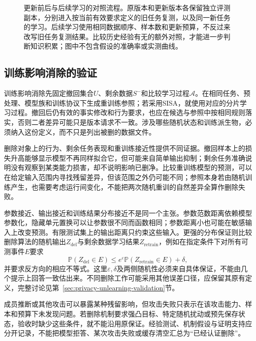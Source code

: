 \begin{figure}[htbp]
\centering

\caption{更新前后与后续学习的对照流程。原版本和更新版本各保留独立评测副本，分别进入按当前有效要求定义的旧任务复测，以及同一新任务的学习。后续学习使用相同数据顺序、样本数和更新预算，不反过来改写旧任务复测结果。比较历史经验有无的额外对照，才能进一步判断知识积累；图中不包含假设的准确率或实测曲线。}
\label{fig:ket-update-evaluation}
\end{figure}

\FloatBarrier
\subsection{训练影响消除的验证}
\label{sec:ket-update-unlearning-validation}

训练影响消除先固定撤回集合$U$、剩余数据$S^-$和比较学习过程$\mathcal A$。在相同任务、预处理、模型族和训练协议下生成重训练参照；若采用SISA，就使用对应的分片学习过程。撤回后仍有效的事实修改和行为要求，也应在候选与参照中按相同规则落实，否则二者差异可能只是版本请求不一致。涉及哪些随机状态和训练派生物，必须纳入这份定义，而不只是列出被删的数据文件。

删除对象上的行为、剩余任务表现和重训练接近性提供不同证据。撤回样本上的损失升高能够显示模型不再同样拟合它，但可能来自简单输出抑制；剩余任务准确说明没有观察到某类能力损害，却不说明影响已删净。比较重训练模型的预测，可以在给定输入范围内寻找残留差异，但该范围之外仍可能不同；参照本身若由随机训练产生，也需要考虑运行间变化，不能把两次随机重训的自然差异全算作删除失败。

参数接近、输出接近和训练结果分布接近不是同一个主张。参数范数距离依赖模型参数化，隐藏单元置换可以让参数很不同而函数相同；参数距离小也可能在敏感输入上改变预测。有限测试集上的输出距离只约束这些输入。更强的分布保证则比较删除算法的随机输出$Z_{\mathrm{del}}$与剩余数据学习结果$Z_{\mathrm{retrain}}$，例如在指定条件下对所有可测事件$E$要求
\[
\mathbb P(Z_{\mathrm{del}}\in E)
\le e^\varepsilon\mathbb P(Z_{\mathrm{retrain}}\in E)+\delta,
\]
并要求反方向的相应不等式。这里$\varepsilon,\delta$及两侧随机性必须来自具体保证，不能由几个提示上回答一致估出来。不同删除工作可能采用其他误差口径，应保留其原有定义，完整讨论见第~\ref{sec:privacy-unlearning-validation}节。

成员推断或其他攻击可以暴露某种残留影响，但攻击失败只表示在该攻击能力、样本和预算下未发现问题。若删除机制要求强凸目标、特定随机扰动或预先保存状态，验收时缺少这些条件，就不能沿用原保证。经验测试、机制假设与证明支持应分开记录，不能把模型拒答、某次攻击失败或缓存清空汇总为“已经认证删除”。

